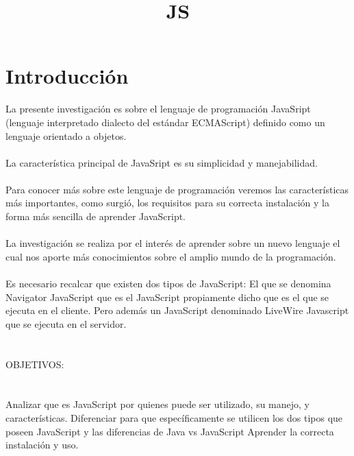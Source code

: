 \documentclass[11pt]{article} %
\title{JS}
\begin{document}
\maketitle

\section{Introducción}
La presente investigación es sobre el lenguaje de programación JavaSript  (lenguaje interpretado  dialecto del estándar ECMAScript) definido como un lenguaje orientado a objetos.\\
\\La característica principal de JavaSript es su simplicidad y manejabilidad.\\
\\Para conocer más sobre este lenguaje de programación veremos las características más importantes,  como surgió, los requisitos para su correcta instalación y la forma más sencilla de aprender JavaScript. \\
\\La investigación se realiza por el interés de aprender sobre un nuevo lenguaje el cual nos aporte más conocimientos sobre el amplio mundo de la programación.\\
\\Es necesario recalcar que existen dos tipos de JavaScript: El que se denomina Navigator JavaScript que es el JavaScript propiamente dicho que es el que se ejecuta en el cliente. Pero además un JavaScript denominado LiveWire Javascript que se ejecuta en el servidor.\\
\\ \\

OBJETIVOS:
\\ \\
\\Analizar que es JavaScript por quienes puede ser utilizado, su manejo, y características.
Diferenciar para que específicamente se utilicen los dos tipos que poseen JavaScript y las diferencias de Java vs JavaScript
Aprender la correcta instalación y uso.\\
\end{document}
